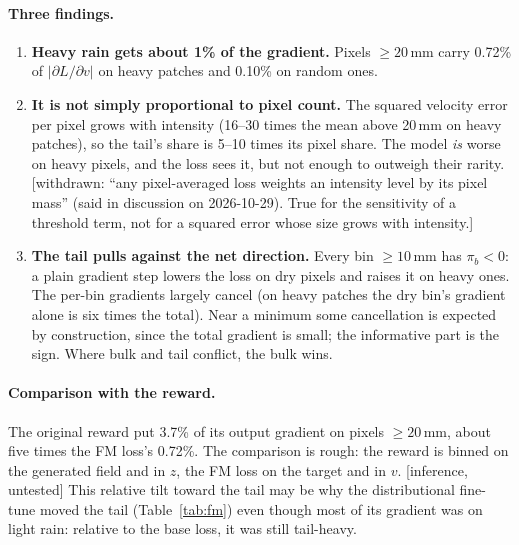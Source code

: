 \documentclass[11pt,a4paper]{article}
\newcommand{\status}[1]{\textsf{\small[#1]}}
\begin{document}
\paragraph{Three findings.}
\begin{enumerate}[leftmargin=1.4em]
\item \textbf{Heavy rain gets about 1\% of the gradient.} Pixels $\ge20$\,mm carry 0.72\% of $|\partial L/\partial v|$ on
heavy patches and 0.10\% on random ones.
\item \textbf{It is not simply proportional to pixel count.} The squared velocity error per pixel grows with intensity
(16--30 times the mean above 20\,mm on heavy patches), so the tail's share is 5--10 times its pixel share. The model
\emph{is} worse on heavy pixels, and the loss sees it, but not enough to outweigh their rarity.
\status{withdrawn: ``any pixel-averaged loss weights an intensity level by its pixel mass'' (said in discussion on
2026-10-29). True for the sensitivity of a threshold term, not for a squared error whose size grows with intensity.}
\item \textbf{The tail pulls against the net direction.} Every bin $\ge10$\,mm has $\pi_b<0$: a plain gradient step lowers
the loss on dry pixels and raises it on heavy ones. The per-bin gradients largely cancel (on heavy patches the dry bin's
gradient alone is six times the total). Near a minimum some cancellation is expected by construction, since the total
gradient is small; the informative part is the sign. Where bulk and tail conflict, the bulk wins.
\end{enumerate}

\paragraph{Comparison with the reward.} The original reward put 3.7\% of its output gradient on pixels $\ge20$\,mm,
about five times the FM loss's 0.72\%. The comparison is rough: the reward is binned on the generated field and in $z$,
the FM loss on the target and in $v$. \status{inference, untested} This relative tilt toward the tail may be why the
distributional fine-tune moved the tail (Table~\ref{tab:fm}) even though most of its gradient was on light rain:
relative to the base loss, it was still tail-heavy.
\end{document}
